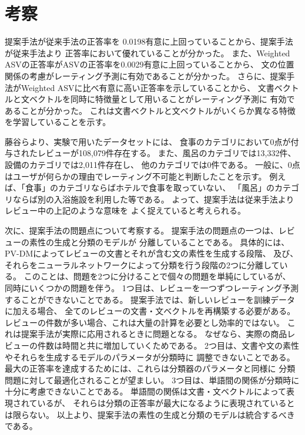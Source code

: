 \section{考察}

提案手法が従来手法\cite{fujitani15}の正答率を
0.0198有意に上回っていることから、提案手法が従来手法\cite{fujitani15}より
正答率において優れていることが分かった。
また、Weighted ASVの正答率がASVの正答率を0.0029有意に上回っていることから、
文の位置関係の考慮がレーティング予測に有効であることが分かった。
さらに、提案手法がWeighted ASVに比べ有意に高い正答率を示していることから、
文書ベクトルと文ベクトルを同時に特徴量として用いることがレーティング予測に
有効であることが分かった。
これは文書ベクトルと文ベクトルがいくらか異なる特徴を学習していることを示す。

藤谷ら\cite{fujitani15}より、実験で用いたデータセットには、
食事のカテゴリにおいて0点が付与されたレビューが108,079件存在する。
また、風呂のカテゴリでは13,332件、設備のカテゴリでは2,011件存在し、
他のカテゴリでは0件である。
一般に、0点はユーザが何らかの理由でレーティング不可能と判断したことを示す。
例えば、「食事」のカテゴリならばホテルで食事を取っていない、
「風呂」のカテゴリならば別の入浴施設を利用した等である。
よって、提案手法は従来手法\cite{fujitani15}よりレビュー中の上記のような意味を
よく捉えていると考えられる。

次に、提案手法の問題点について考察する。
提案手法の問題点の一つは、レビューの素性の生成と分類のモデルが
分離していることである。
具体的には、PV-DMによってレビューの文書とそれが含む文の素性を生成する段階、
及び、それらをニューラルネットワークによって分類を行う段階の2つに分離している。
このことは、問題を2つに分けることで個々の問題を単純にしているが、
同時にいくつかの問題を伴う。
1つ目は、レビューを一つずつレーティング予測することができないことである。
提案手法では、新しいレビューを訓練データに加える場合、
全てのレビューの文書・文ベクトルを再構築する必要がある。
レビューの件数が多い場合、これは大量の計算を必要とし効率的ではない。
これは提案手法が実際に応用されるときに問題となる。
なぜなら、実際の商品レビューの件数は時間と共に増加していくためである。
2つ目は、文書や文の素性やそれらを生成するモデルのパラメータが分類時に
調整できないことである。
最大の正答率を達成するためには、これらは分類器のパラメータと同様に
分類問題に対して最適化されることが望ましい。
3つ目は、単語間の関係が分類時に十分に考慮できないことである。
単語間の関係は文書・文ベクトルによって表現されているが、
それらは分類の正答率が最大になるように表現されているとは限らない。
以上より、提案手法の素性の生成と分類のモデルは統合するべきである。
